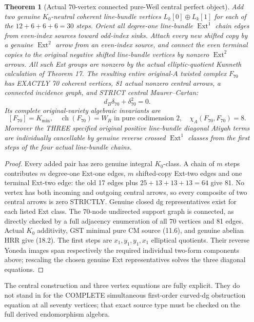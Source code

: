 \documentclass[11pt,a4paper]{article}
\newcommand{\ch}{\operatorname{ch}}
\newtheorem{theorem}{Theorem}[section]
\begin{document}
\begin{theorem}[Actual 70-vertex connected pure-Weil central perfect object]
Add two genuine \(K_0\)-neutral coherent
line-bundle vertices \(L_k[0]\oplus L_k[1]\)
for each of the \(12+6+6+6=30\) steps.
Orient all degree-one line-bundle
\(\operatorname{Ext}^1\) chain edges
from even-index sources toward odd-index
sinks. Attach every new shifted copy by a
genuine \(\operatorname{Ext}^2\) arrow
from an even-index source, and connect
the even terminal copies to the original
negative shifted line-bundle vertices by
nonzero \(\operatorname{Ext}^2\) arrows.
All such Ext groups are nonzero by the
actual elliptic-quotient Kunneth calculation
of Theorem 17.
The resulting entire original-\(A\)
twisted complex \(F_{70}\) has EXACTLY
70 coherent vertices, 81 actual nonzero
central arrows, a connected incidence
graph, and STRICT central Maurer--Cartan:
\[
 d_B\delta_{70}+\delta_{70}^2=0.
\]
Its complete original-variety algebraic
invariants are
\[
 \boxed{[F_{70}]=K_{\min},\quad
 \ch(F_{70})=W_R\text{ in pure codimension }2,\quad
 \chi_A(F_{70},F_{70})=8.}                       \tag{18.2}
\]
Moreover the THREE specified original
positive line-bundle diagonal Atiyah terms
are individually cancellable by genuine
reverse crossed \(\operatorname{Ext}^1\)
classes from the first steps of the four
actual line-bundle chains.
\end{theorem}
\begin{proof}
Every added pair has zero genuine integral
\(K_0\)-class. A chain of \(m\) steps
contributes \(m\) degree-one Ext-one edges,
\(m\) shifted-copy Ext-two edges and one
terminal Ext-two edge: the old 17 edges
plus \(25+13+13+13=64\) give 81.
No vertex has both incoming and outgoing
central arrows, so every composite of
two central arrows is zero STRICTLY.
Genuine closed dg representatives exist
for each listed Ext class. The 70-node
undirected support graph is connected,
as directly checked by a full adjacency
enumeration of all 70 vertices and 81 edges.
Actual \(K_0\) additivity, GST minimal pure
CM source (11.6), and genuine abelian
HRR give (18.2). The first steps are
\(x_1,y_1,y_1,x_1\) elliptical
quotients. Their reverse Yoneda images
span respectively the required individual
two-form components above; rescaling
the chosen genuine Ext representatives
solves the three diagonal equations.
\end{proof}
The central construction and three vertex
equations are fully explicit. They do not
stand in for the COMPLETE simultaneous
first-order curved-dg obstruction equation
at all seventy vertices; that exact source
type must be checked on the full derived
endomorphism algebra.
\end{document}
